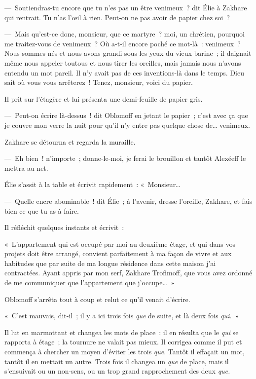\documentclass[french,twoside]{book} %
\begin{document}
— Soutiendras-tu encore que tu n’es pas un être venimeux ? dit Élie à Zakhare qui rentrait. Tu n’as l’œil à rien. Peut-on ne pas avoir de papier chez soi ?\par
— Mais qu’est-ce donc, monsieur, que ce martyre ? moi, un chrétien, pourquoi me traitez-vous de venimeux ? Où a-t-il encore poché ce mot-là : venimeux ? Nous sommes nés et nous avons grandi sous les yeux du vieux barine ; il daignait même nous appeler toutous et nous tirer les oreilles, mais jamais nous n’avons entendu un mot pareil. Il n’y avait pas de ces inventions-là dans le temps. Dieu sait où vous vous arrêterez ! Tenez, monsieur, voici du papier.\par
Il prit sur l’étagère et lui présenta une demi-feuille de papier gris.\par
— Peut-on écrire là-dessus ! dit Oblomoff en jetant le papier ; c’est avec ça que je couvre mon verre la nuit pour qu’il n’y entre pas quelque chose de… venimeux.\par
Zakhare se détourna et regarda la muraille.\par
— Eh bien ! n’importe ; donne-le-moi, je ferai le brouillon et tantôt Alexéeff le mettra au net.\par
Élie s’assit à la table et écrivit rapidement : « Monsieur…\par
— Quelle encre abominable ! dit Élie ; à l’avenir, dresse l’oreille, Zakhare, et fais bien ce que tu as à faire.\par
Il réfléchit quelques instants et écrivit :\par
« L’appartement qui est occupé par moi au deuxième étage, et qui dans vos projets doit être arrangé, convient parfaitement à ma façon de vivre et aux habitudes que par suite de ma longue résidence dans cette maison j’ai contractées. Ayant appris par mon serf, Zakhare Trofimoff, que vous avez ordonné de me communiquer que l’appartement que j’occupe… »\par
Oblomoff s’arrêta tout à coup et relut ce qu’il venait d’écrire.\par
« C’est mauvais, dit-il ; il y a ici trois fois \emph{que} de suite, et là deux fois \emph{qui}. »\par
Il lut en marmottant et changea les mots de place : il en résulta que le \emph{qui} se rapporta à étage ; la tournure ne valait pas mieux. Il corrigea comme il put et commença à chercher un moyen d’éviter les trois \emph{que}. Tantôt il effaçait un mot, tantôt il en mettait un autre. Trois fois il changea un \emph{que} de place, mais il s’ensuivait ou un non-sens, ou un trop grand rapprochement des deux \emph{que.}\par
\end{document}
